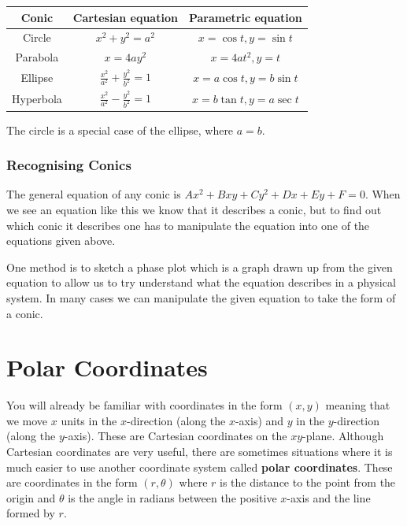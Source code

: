 \begin{table}[H]
\centering
\renewcommand{\arraystretch}{1.8}
\begin{tabular}{c|c|c}
\hline\hline
Conic & Cartesian equation & Parametric equation \\
\hline
Circle & $x^2+y^2=a^2$ & $x=\cos t, y=\sin t$ \\
Parabola & $x=4ay^2$ & $x=4at^2, y=t$ \\
Ellipse & $\frac{x^2}{a^2}+\frac{y^2}{b^2}=1$ & $x=a\cos t, y=b\sin t$ \\
Hyperbola & $\frac{x^2}{a^2}-\frac{y^2}{b^2}=1$ & $x=b\tan t, y=a\sec t$ \\
\hline\hline
\end{tabular}
\end{table}

\begin{remark}
The circle is a special case of the ellipse, where $a=b$.
\end{remark}

\subsubsection{Recognising Conics}
The general equation of any conic is $Ax^2 + Bxy + Cy^2 + Dx + Ey + F = 0$. When we see an equation like this we know that it describes a conic, but to find out which conic it describes one has to manipulate the equation into one of the equations given above.

One method is to sketch a phase plot which is a graph drawn up from the given equation to allow us to try understand what the equation describes in a physical system. In many cases we can manipulate the given equation to take the form of a conic.
\pagebreak

\section{Polar Coordinates}
You will already be familiar with coordinates in the form $(x, y)$ meaning that we move $x$ units in the $x$-direction (along the $x$-axis) and $y$ in the $y$-direction (along the $y$-axis). These are Cartesian coordinates on the $xy$-plane. Although Cartesian coordinates are very useful, there are sometimes situations where it is much easier to use another coordinate system called \textbf{polar coordinates}. These are coordinates in the form $(r,\theta)$ where $r$ is the distance to the point from the origin and $\theta$ is the angle in radians between the positive $x$-axis and the line formed by $r$.

